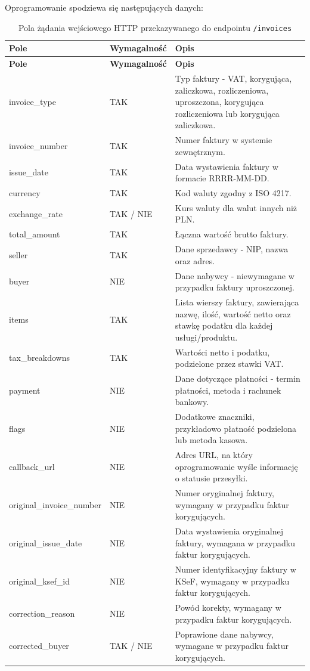 \noindent Oprogramowanie spodziewa się następujących danych:
\begin{small}
\begin{longtable}{>{\raggedright\arraybackslash}p{4cm} >{\raggedright\arraybackslash}p{2cm} >{\raggedright\arraybackslash}p{7cm}}
\caption{Pola żądania wejściowego HTTP przekazywanego do endpointu \texttt{/invoices}}
\label{tab:invoice_input_fields} \\
\toprule
\textbf{Pole} & \textbf{Wymagalność} & \textbf{Opis} \\
\midrule
\endfirsthead

\toprule
\textbf{Pole} & \textbf{Wymagalność} & \textbf{Opis} \\
\midrule
\endhead

\bottomrule
\endfoot

invoice\_type & TAK & Typ faktury - VAT, korygująca, zaliczkowa, rozliczeniowa, uproszczona, korygująca rozliczeniowa lub korygująca zaliczkowa. \\
invoice\_number & TAK & Numer faktury w systemie zewnętrznym. \\
issue\_date & TAK & Data wystawienia faktury w formacie RRRR-MM-DD. \\
currency & TAK & Kod waluty zgodny z ISO 4217. \\
exchange\_rate & TAK / NIE & Kurs waluty dla walut innych niż PLN. \\
total\_amount & TAK & Łączna wartość brutto faktury. \\
seller & TAK & Dane sprzedawcy - NIP, nazwa oraz adres. \\
buyer & NIE & Dane nabywcy - niewymagane w przypadku faktury uproszczonej. \\
items & TAK & Lista wierszy faktury, zawierająca nazwę, ilość, wartość netto oraz stawkę podatku dla każdej usługi/produktu. \\
tax\_breakdowns & TAK & Wartości netto i podatku, podzielone przez stawki VAT. \\
payment & NIE & Dane dotyczące płatności - termin płatności, metoda i rachunek bankowy. \\
flags & NIE & Dodatkowe znaczniki, przykładowo płatność podzielona lub metoda kasowa. \\
callback\_url & NIE & Adres URL, na który oprogramowanie wyśle informację o statusie przesyłki. \\
original\_invoice\_number & NIE & Numer oryginalnej faktury, wymagany w przypadku faktur korygujących. \\
original\_issue\_date & NIE & Data wystawienia oryginalnej faktury, wymagana w przypadku faktur korygujących. \\
original\_ksef\_id & NIE & Numer identyfikacyjny faktury w KSeF, wymagany w przypadku faktur korygujących. \\
correction\_reason & NIE & Powód korekty, wymagany w przypadku faktur korygujących. \\
corrected\_buyer & TAK / NIE & Poprawione dane nabywcy, wymagane w przypadku faktur korygujących. \\
\end{longtable}
\end{small}

